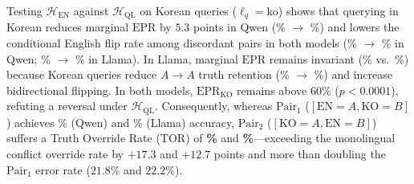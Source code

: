 Testing $\mathcal{H}_{\text{EN}}$ against $\mathcal{H}_{\text{QL}}$ on Korean queries ($\ell_q{=}\text{ko}$) shows that querying in Korean reduces marginal $\text{EPR}$ by $5.3$ points in Qwen (\qwenEPREN\% $\to$ \qwenEPRKO\%) and lowers the conditional English flip rate among discordant pairs in both models (\qwenCondENFlipEN\% $\to$ \qwenCondENFlipKO\% in Qwen; \llamaCondENFlipEN\% $\to$ \llamaCondENFlipKO\% in Llama). In Llama, marginal $\text{EPR}$ remains invariant (\llamaEPREN\% vs.\ \llamaEPRKO\%) because Korean queries reduce $A \to A$ truth retention (\llamaTruthAARateEN\% $\to$ \llamaTruthAARateKO\%) and increase bidirectional flipping. In both models, $\text{EPR}_{\text{KO}}$ remains above $60\%$ ($p < 0.0001$), refuting a reversal under $\mathcal{H}_{\text{QL}}$. Consequently, whereas $\text{Pair}_1$ ($[\text{EN}{=}A, \text{KO}{=}B]$) achieves \qwenPairOneAccAll\% (Qwen) and \llamaPairOneAccAll\% (Llama) accuracy, $\text{Pair}_2$ ($[\text{KO}{=}A, \text{EN}{=}B]$) suffers a Truth Override Rate ($\text{TOR}$) of \textbf{\qwenPairTwoOverrideAll\%} and \textbf{\llamaPairTwoOverrideAll\%}---exceeding the monolingual conflict override rate by $+17.3$ and $+12.7$ points and more than doubling the $\text{Pair}_1$ error rate ($21.8\%$ and $22.2\%$).
